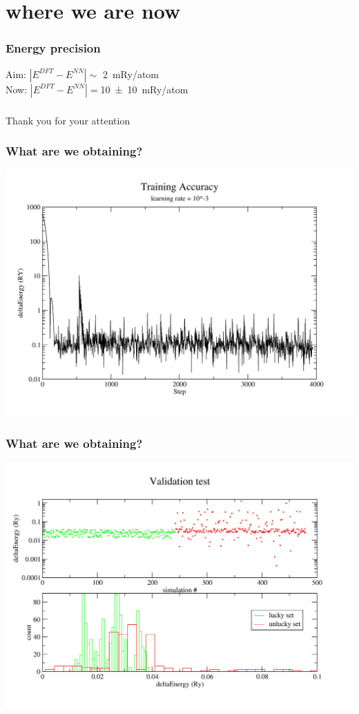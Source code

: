 \documentclass[12pt,notes=off,unicode]{beamer}
\begin{document}
  \section{where we are now} %
  \label{sec:where_we_are_now}

    \begin{frame}[c]\frametitle{Energy precision}
        
    Aim\footnotemark: $\left|E^{DFT}-E^{NN}\right|\sim$ \SI{2}{mRy/atom}\\
    Now: $\left|E^{DFT}-E^{NN}\right|= $\SI[separate-uncertainty = true]{10(10)}{mRy/atom}
    \end{frame}

    \begin{frame}[c]\frametitle{}
      
      \begin{center}
        Thank you for your attention
      \end{center}
    
    \end{frame}
  
    \begin{frame}[noframenumbering, c]\frametitle{What are we obtaining?}
    
      \includegraphics[width=\textwidth]{img/pres1.png}
    
    \end{frame}

    \begin{frame}[noframenumbering, c]\frametitle{What are we obtaining?}
    
      \includegraphics[width=\textwidth]{img/pres2.png}
    
    \end{frame}
\end{document}
